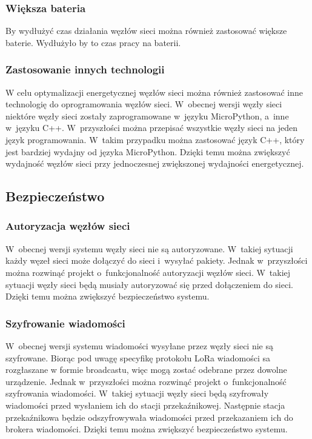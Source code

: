 \subsubsection*{Większa bateria}
By wydłużyć czas działania węzłów sieci można również zastosować większe baterie. Wydłużyło by to czas pracy na baterii.

\subsubsection*{Zastosowanie innych technologii}
W celu optymalizacji energetycznej węzłów sieci można również zastosować inne technologię do oprogramowania węzłów sieci. W~obecnej wersji węzły sieci niektóre węzły sieci zostały zaprogramowane w~języku MicroPython, a~inne w~języku C++. W~przyszłości można przepisać wszystkie węzły sieci na jeden język programowania. W~takim przypadku można zastosować język C++, który jest bardziej wydajny od języka MicroPython. Dzięki temu można zwiększyć wydajność węzłów sieci przy jednoczesnej zwiększonej wydajności energetycznej.

\subsection{Bezpieczeństwo}

\subsubsection{Autoryzacja węzłów sieci}
W~obecnej wersji systemu węzły sieci nie są autoryzowane. W~takiej sytuacji każdy węzeł sieci może dołączyć do sieci i~wysyłać pakiety. Jednak w~przyszłości można rozwinąć projekt o~funkcjonalność autoryzacji węzłów sieci. W~takiej sytuacji węzły sieci będą musiały autoryzować się przed dołączeniem do sieci. Dzięki temu można zwiększyć bezpieczeństwo systemu.

\subsubsection{Szyfrowanie wiadomości}
W~obecnej wersji systemu wiadomości wysyłane przez węzły sieci nie są szyfrowane. Biorąc pod uwagę specyfikę protokołu LoRa wiadomości sa rozgłaszane w formie broadcastu, więc mogą zostać odebrane przez dowolne urządzenie. Jednak w~przyszłości można rozwinąć projekt o~funkcjonalność szyfrowania wiadomości. W~takiej sytuacji węzły sieci będą szyfrowały wiadomości przed wysłaniem ich do stacji przekaźnikowej. Następnie stacja przekaźnikowa będzie odszyfrowywała wiadomości przed przekazaniem ich do brokera wiadomości. Dzięki temu można zwiększyć bezpieczeństwo systemu.

